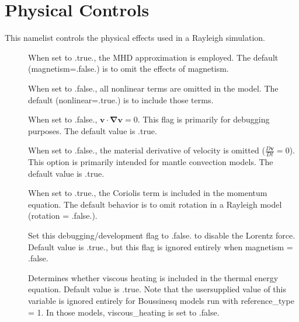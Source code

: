 \documentclass[letterpaper,11pt,english]{sphinxmanual}
\begin{document}
\section{Physical Controls}
\label{\detokenize{doc/source/Namelist_Definitions/Namelist_Variables:physical-controls}}
\sphinxAtStartPar
This namelist controls the physical effects used in a Rayleigh simulation.
\begin{description}
\item[{}] \leavevmode
\sphinxAtStartPar
When set to .true., the MHD approximation is employed.   The default (magnetism=.false.) is to omit the effects of magnetism.

\item[{}] \leavevmode
\sphinxAtStartPar
When set to .false., all nonlinear terms are omitted in the model.  The default (nonlinear=.true.) is to include those terms.

\item[{}] \leavevmode
\sphinxAtStartPar
When set to .false., \(\boldsymbol{v}\cdot\boldsymbol{\nabla}\boldsymbol{v}=0\).  This flag is primarily for debugging purposes.  The default value is .true.

\item[{}] \leavevmode
\sphinxAtStartPar
When set to .false., the material derivative of velocity is omitted (\(\frac{D\boldsymbol{v}}{Dt}=0\)).  This option is primarily intended for mantle convection models.  The default value is .true.

\item[{}] \leavevmode
\sphinxAtStartPar
When set to .true., the Coriolis term is included in the momentum equation.   The default behavior is to omit rotation in a Rayleigh model (rotation = .false.).

\item[{}] \leavevmode
\sphinxAtStartPar
Set this debugging/development flag to .false. to disable the Lorentz force.  Default value is .true., but this flag is ignored entirely when magnetism = .false.

\item[{}] \leavevmode
\sphinxAtStartPar
Determines whether viscous heating is included in the thermal energy equation.  Default value is .true.  Note that the user\sphinxhyphen{}supplied value of this variable is ignored entirely for Boussinesq models run with reference\_type = 1.  In those models, viscous\_heating is set to .false.


\end{description}
\end{document}
